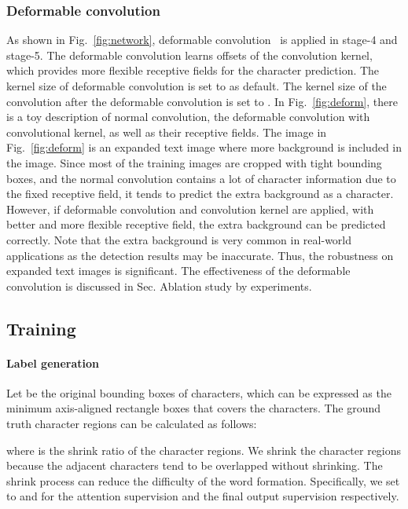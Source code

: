 \documentclass[letterpaper]{article} \usepackage{aaai19}  \usepackage{times}  \usepackage{helvet}  \usepackage{courier}  \usepackage{url}  \usepackage{graphicx}  \frenchspacing  \usepackage{multirow}
\begin{document}
\subsubsection{Deformable convolution}
As shown in Fig.~\ref{fig:network}, deformable convolution~\cite{deform} is applied in stage-4 and stage-5. The deformable convolution learns offsets of the convolution kernel, which provides more flexible receptive fields for the character prediction. The kernel size of deformable convolution is set to  as default. The kernel size of the convolution after the deformable convolution is set to . In Fig.~\ref{fig:deform}, there is a toy description of normal convolution, the deformable convolution with  convolutional kernel, as well as their receptive fields. The image in Fig.~\ref{fig:deform} is an expanded text image where more background is included in the image. Since most of the training images are cropped with tight bounding boxes, and the normal convolution contains a lot of character information due to the fixed receptive field, it tends to predict the extra background as a character. However, if deformable convolution and  convolution kernel are applied, with better and more flexible receptive field, the extra background can be predicted correctly. Note that the extra background is very common in real-world applications as the detection results may be inaccurate. Thus, the robustness on expanded text images is significant. The effectiveness of the deformable convolution is discussed in Sec. Ablation study by experiments.

\subsection{Training}
\paragraph{Label generation}
Let  be the original bounding boxes of characters, which can be expressed as the minimum axis-aligned rectangle boxes that covers the characters. The ground truth character regions  can be calculated as follows:

where  is the shrink ratio of the character regions. We shrink the character regions because the adjacent characters tend to be overlapped without shrinking. The shrink process can reduce the difficulty of the word formation. Specifically, we set  to  and  for the attention supervision and the final output supervision respectively.
\end{document}

